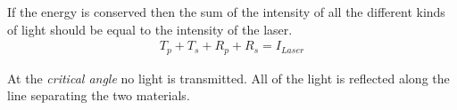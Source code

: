 \documentclass[working]{inputs/tuftebook}
\begin{document}
If the energy is conserved then the sum of the intensity of all the different kinds of light should be equal to the intensity of the laser.
\begin{align*}
    T_p+T_s+R_p+R_s=I_{Laser}
\end{align*}
\begin{marginfigure}
    \caption{At the \textit{critical angle} no light is transmitted. All of the light is reflected along the line separating the two materials. }
    \label{fig:fresnel3}
\end{marginfigure}
\end{document}
